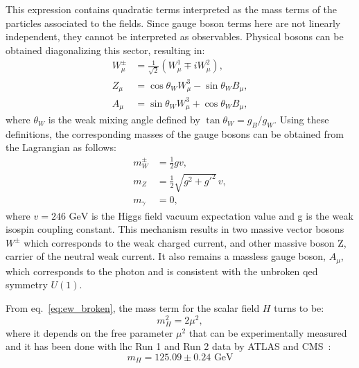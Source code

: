 This expression contains quadratic terms interpreted as the mass terms of the particles associated to the fields. Since gauge boson terms here are not linearly independent, they cannot be interpreted as observables. Physical bosons can be obtained diagonalizing this sector, resulting in:
\begin{align}
W^\pm_\mu &= \frac{1}{\sqrt{2}} \left( W^1_\mu \mp i W^2_\mu \right), \\
Z_\mu &= \cos\theta_W W^3_\mu - \sin\theta_W B_\mu, \\
A_\mu &= \sin\theta_W W^3_\mu + \cos\theta_W B_\mu,
\end{align}
where $\theta_W$ is the weak mixing angle defined by $\tan \theta_W = g_B /g_W$.
Using these definitions, the corresponding masses of the gauge bosons can be obtained from the Lagrangian as follows:
\begin{align}
m^{\pm}_W &= \frac{1}{2} g v, \\
m_Z &= \frac{1}{2} \sqrt{g^2 + g'^2} \, v, \\
m_\gamma &= 0,
\end{align}
where $v = 246 \text{  GeV}$ is the Higgs field vacuum expectation value and g is the weak isospin coupling constant. 
This mechanism results in two massive vector bosons $W^{\pm}$ which corresponds to the weak charged current, and other massive boson Z, carrier of the neutral weak current. It also remains a massless gauge boson, $A_{\mu}$, which corresponds to the photon and is consistent with the unbroken \acrshort{qed} symmetry $U(1)$.

From eq.~\ref{eq:ew_broken}, the mass term for the scalar field $H$ turns to be:
\begin{equation}
m_H^2 = 2 \mu^2,
\end{equation}
where it depends on the free parameter $\mu^2$ that can be experimentally measured and it has been done with \acrshort{lhc} Run 1 and Run 2 data by ATLAS and CMS~\cite{ATLASCMS}:
\begin{equation}
m_H = 125.09 \pm 0.24 \text{ GeV}
\end{equation}

